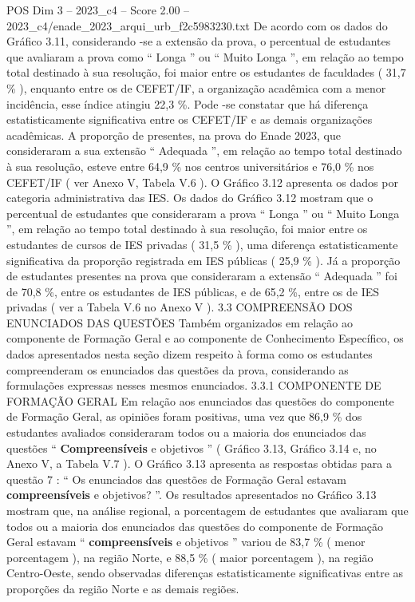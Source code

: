 \begin{textsample}{POS Dim 3 – 2023\_c4 – Score 2.00 – 2023\_c4/enade\_2023\_arqui\_urb\_f2c5983230.txt}
De acordo com os dados do Gráfico 3.11, considerando -se a extensão da prova, o percentual de estudantes que avaliaram a prova como “ Longa ” ou “ Muito Longa ”, em relação ao tempo total destinado à sua resolução, foi maior entre os estudantes de faculdades ( 31,7 \% ), enquanto entre os de CEFET/IF, a organização acadêmica com a menor incidência, esse índice atingiu 22,3 \%.
Pode -se constatar que há diferença estatisticamente significativa entre os CEFET/IF e as demais organizações acadêmicas.
A proporção de presentes, na prova do Enade 2023, que consideraram a sua extensão “ Adequada ”, em relação ao tempo total destinado à sua resolução, esteve entre 64,9 \% nos centros universitários e 76,0 \% nos CEFET/IF ( ver Anexo V, Tabela V.6 ).
O Gráfico 3.12 apresenta os dados por categoria administrativa das IES.
Os dados do Gráfico 3.12 mostram que o percentual de estudantes que consideraram a prova “ Longa ” ou “ Muito Longa ”, em relação ao tempo total destinado à sua resolução, foi maior entre os estudantes de cursos de IES privadas ( 31,5 \% ), uma diferença estatisticamente significativa da proporção registrada em IES públicas ( 25,9 \% ).
Já a proporção de estudantes presentes na prova que consideraram a extensão “ Adequada ” foi de 70,8 \%, entre os estudantes de IES públicas, e de 65,2 \%, entre os de IES privadas ( ver a Tabela V.6 no Anexo V ). 3.3 COMPREENSÃO DOS ENUNCIADOS DAS QUESTÕES Também organizados em relação ao componente de Formação Geral e ao componente de Conhecimento Específico, os dados apresentados nesta seção dizem respeito à forma como os estudantes compreenderam os enunciados das questões da prova, considerando as formulações expressas nesses mesmos enunciados. 3.3.1 COMPONENTE DE FORMAÇÃO GERAL Em relação aos enunciados das questões do componente de Formação Geral, as opiniões foram positivas, uma vez que 86,9 \% dos estudantes avaliados consideraram todos ou a maioria dos enunciados das questões “ \textbf{Compreensíveis} e objetivos ” ( Gráfico 3.13, Gráfico 3.14 e, no Anexo V, a Tabela V.7 ).
O Gráfico 3.13 apresenta as respostas obtidas para a questão 7 : “ Os enunciados das questões de Formação Geral estavam \textbf{compreensíveis} e objetivos? ”.
Os resultados apresentados no Gráfico 3.13 mostram que, na análise regional, a porcentagem de estudantes que avaliaram que todos ou a maioria dos enunciados das questões do componente de Formação Geral estavam “ \textbf{compreensíveis} e objetivos ” variou de 83,7 \% ( menor porcentagem ), na região Norte, e 88,5 \% ( maior porcentagem ), na região Centro-Oeste, sendo observadas diferenças estatisticamente significativas entre as proporções da região Norte e as demais regiões.

\end{textsample}
